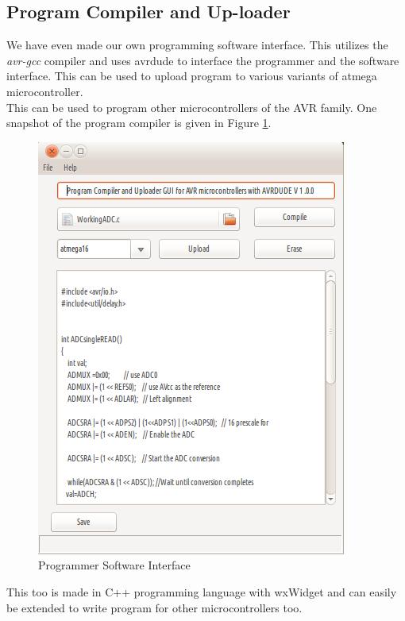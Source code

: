 \documentclass[12pt,a4paper]{article}
\begin{document}
\subsection{Program Compiler and Up-loader}	
We have even made our own programming software interface. This utilizes the \emph{avr-gcc} compiler and uses avrdude to interface the programmer and the software interface. This can be used to upload program to various variants of atmega microcontroller.\\ This can be used to program other microcontrollers of the AVR family. One snapshot of the program compiler is given in Figure \ref{fig:Programmer}.



\begin{figure}[hbtp]
\centering
\includegraphics[scale=.5]{Images/AvrGUI.png}
\caption{Programmer Software Interface}
\label{fig:Programmer}
\end{figure}

This too is made in C++ programming language with wxWidget and can easily be extended to write program for other microcontrollers too. 
\end{document}
